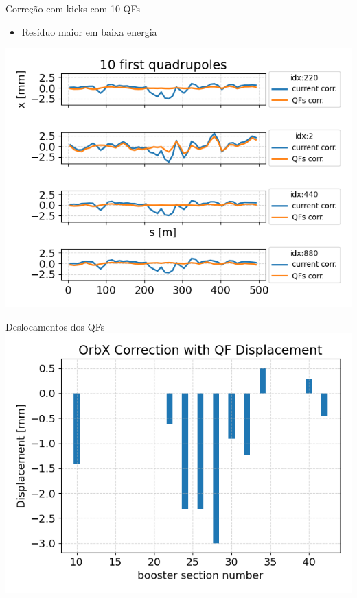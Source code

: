 \documentclass[1611]{beamer}					  %
\begin{document}
\begin{frame}{Correção com kicks com 10 QFs}
\vspace{0.5cm}
\begin{itemize}
    \item Resíduo maior em baixa energia
\vspace{0.5cm}
\end{itemize}
\centering
    \includegraphics[scale=0.5]{2024-04-19/figures/bo-cod-corr-ramp.png}
\end{frame}

\begin{frame}{Deslocamentos dos QFs}
\vspace{0.5cm}
\centering
    \includegraphics[scale=0.5]{2024-04-19/figures/qfs-displacements.png}
\end{frame}

\end{document}
